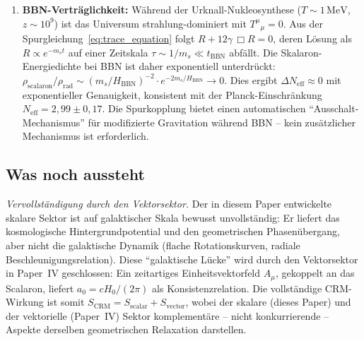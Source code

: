 \documentclass[11pt,a4paper]{article}
\begin{document}
\begin{enumerate}
\item \textbf{BBN-Vertr\"aglichkeit:} W\"ahrend der Urknall-Nukleosynthese ($T \sim 1\,\mathrm{MeV}$, $z \sim 10^9$) ist das Universum strahlung-dominiert mit $T^{\mu}{}_{\mu} = 0$. Aus der Spurgleichung~\eqref{eq:trace_equation} folgt $R + 12\gamma\,\Box R = 0$, deren L\"osung als $R \propto e^{-m_s t}$ auf einer Zeitskala $\tau \sim 1/m_s \ll t_{\mathrm{BBN}}$ abf\"allt. Die Skalaron-Energiedichte bei BBN ist daher exponentiell unterdr\"uckt: $\rho_{\mathrm{scalaron}}/\rho_{\mathrm{rad}} \sim (m_s/H_{\mathrm{BBN}})^{-2} \cdot e^{-2m_s/H_{\mathrm{BBN}}} \to 0$. Dies ergibt $\Delta N_{\mathrm{eff}} \approx 0$ mit exponentieller Genauigkeit, konsistent mit der Planck-Einschr\"ankung $N_{\mathrm{eff}} = 2{,}99 \pm 0{,}17$. Die Spurkopplung bietet einen automatischen "`Ausschalt-Mechanismus"' f\"ur modifizierte Gravitation w\"ahrend BBN -- kein zus\"atzlicher Mechanismus ist erforderlich.
\end{enumerate}

\subsection{Was noch aussteht}

\textit{Vervollst\"andigung durch den Vektorsektor.} Der in diesem Paper entwickelte skalare Sektor ist auf galaktischer Skala bewusst unvollst\"andig: Er liefert das kosmologische Hintergrundpotential und den geometrischen Phasen\"ubergang, aber nicht die galaktische Dynamik (flache Rotationskurven, radiale Beschleunigungsrelation). Diese ``galaktische L\"ucke'' wird durch den Vektorsektor in Paper~IV \cite{Geiger2026d} geschlossen: Ein zeitartiges Einheitsvektorfeld $A_\mu$, gekoppelt an das Scalaron, liefert $a_0 = cH_0/(2\pi)$ als Konsistenzrelation. Die vollst\"andige CRM-Wirkung ist somit $S_{\mathrm{CRM}} = S_{\mathrm{scalar}} + S_{\mathrm{vector}}$, wobei der skalare (dieses Paper) und der vektorielle (Paper~IV) Sektor komplement\"are -- nicht konkurrierende -- Aspekte derselben geometrischen Relaxation darstellen.
\end{document}
